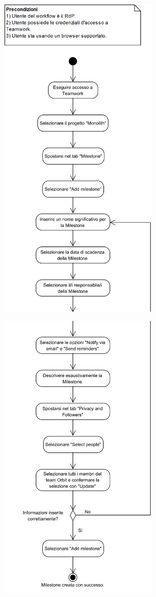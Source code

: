 \begin{center}
	\includegraphics[width=8cm]{./DiagrammiProcedure/CreazioneMilestone1.png}
\end{center}

\begin{center}
	\includegraphics[width=8cm]{./DiagrammiProcedure/CreazioneMilestone2.png}
\end{center}

